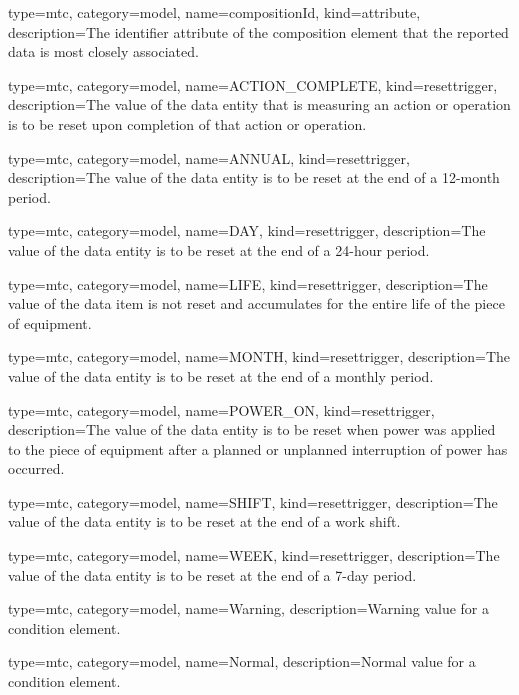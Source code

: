 {
  type=mtc,
  category=model,
  name={compositionId},
  kind={attribute},
  description={The identifier attribute of the \gls{composition} element that the reported data is most closely associated. }
}


{
  type=mtc,
  category=model,
  name={ACTION\_COMPLETE},
  kind={resettrigger},
  description={The value of the \gls{data entity} that is measuring an action or operation is to be reset upon completion of that action or operation.}
}


{
  type=mtc,
  category=model,
  name={ANNUAL},
  kind={resettrigger},
  description={The value of the \gls{data entity} is to be reset at the end of a 12-month period.}
}


{
  type=mtc,
  category=model,
  name={DAY},
  kind={resettrigger},
  description={The value of the \gls{data entity} is to be reset at the end of a 24-hour period.}
}


{
  type=mtc,
  category=model,
  name={LIFE},
  kind={resettrigger},
  description={The value of the data item is not reset and accumulates for the entire life of the piece of equipment.}
}


{
  type=mtc,
  category=model,
  name={MONTH},
  kind={resettrigger},
  description={The value of the \gls{data entity} is to be reset at the end of a monthly period.}
}


{
  type=mtc,
  category=model,
  name={POWER\_ON},
  kind={resettrigger},
  description={The value of the \gls{data entity} is to be reset when power was applied to the piece of equipment after a planned or unplanned interruption of power has occurred.}
}


{
  type=mtc,
  category=model,
  name={SHIFT},
  kind={resettrigger},
  description={The value of the \gls{data entity} is to be reset at the end of a work shift.}
}


{
  type=mtc,
  category=model,
  name={WEEK},
  kind={resettrigger},
  description={The value of the \gls{data entity} is to be reset at the end of a 7-day period.}
}


{
  type=mtc,
  category=model,
  name={Warning},
  description={Warning value for a \gls{condition} element.}
}


{
  type=mtc,
  category=model,
  name={Normal},
  description={Normal value for a \gls{condition} element.}
}


